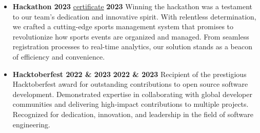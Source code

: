 \documentclass[letterpaper, 11pt]{article}
\newcommand{\secStartSpace}{\vspace{3pt}}
\newcommand{\secEndSpace}{\vspace{5pt}}
\begin{document}
\begin{addmargin}[1em]{1em}
	\begin{itemize}[itemsep=-2.25pt]
		\item \textbf{Hackathon 2023} 
  \href{https://sukhlotey.github.io/imSukhpreet/Images/hackathon.pdf}{\underline{certificate}} \hfill \textbf{2023}
  \newline
    \secStartSpace
  Winning the hackathon was a testament to our team's dedication and innovative spirit. With relentless determination, we crafted a cutting-edge sports management system that promises to revolutionize how sports events are organized and managed. From seamless registration processes to real-time analytics, our solution stands as a beacon of efficiency and convenience.
  \secEndSpace
  
		\item \textbf {Hacktoberfest 2022 \& 2023} \hfill  \textbf{2022 \& 2023}
\newline
\secStartSpace
Recipient of the prestigious Hacktoberfest award for outstanding contributions to open source software development. Demonstrated expertise in collaborating with global developer communities and delivering high-impact contributions to multiple projects. Recognized for dedication, innovation, and leadership in the field of software engineering.
\secEndSpace
  
\end{itemize}
\end{addmargin}




\end{document}
